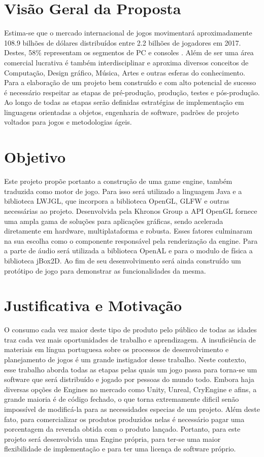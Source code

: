 \documentclass[12pt, 
openright, 
oneside, 
a4paper,    
brazil]{facom-ufu-abntex2}
\begin{document}
\section{Visão Geral da Proposta}
Estima-se que o mercado internacional de jogos movimentará aproximadamente 108.9
bilhões de dólares distribuídos entre 2.2 bilhões de jogadores em 2017. Destes, 58\%
representam os segmentos de PC e consoles \cite{GameMarketArticle}. Além de ser uma área
comercial lucrativa é também interdisciplinar e aproxima
diversos conceitos de Computação, Design gráfico, Música, Artes e outras esferas do
conhecimento.
Para a elaboração de um projeto bem construído e com alto potencial de
sucesso é necessário respeitar as etapas de pré-produção, produção, testes
e pós-produção. Ao longo de todas as etapas serão definidas estratégias de
implementação em linguagens orientadas a objetos, engenharia de software, padrões de projeto
voltados para jogos e metodologias ágeis.

\section{Objetivo}
Este projeto propõe portanto a construção de uma game engine, também traduzida como motor de jogo. Para isso será utilizado a linguagem Java e a biblioteca LWJGL, que incorpora a biblioteca OpenGL, GLFW e outras necessárias ao projeto.
Desenvolvida pela Khronos Group a API OpenGL fornece uma ampla gama de soluções para aplicações gráficas, sendo acelerada diretamente em
hardware, multiplataforma e robusta. Esses fatores culminaram na sua escolha como o componente responsável pela renderização da engine. Para a parte de áudio será utilizada a biblioteca OpenAL e para o modulo de física a biblioteca jBox2D. 
Ao fim de seu desenvolvimento será ainda construído um protótipo de jogo para demonstrar as funcionalidades da mesma. %

\section{Justificativa e Motivação}
O consumo cada vez maior deste tipo de produto pelo público de todas as idades traz cada vez mais oportunidades de trabalho e aprendizagem.
A insuficiência de materiais em língua portuguesa sobre os processos de desenvolvimento e planejamento de jogos é um grande instigador desse trabalho. Neste contexto, esse trabalho aborda todas as etapas pelas quais um jogo passa para torna-se um software que será distribuído e jogado por pessoas do mundo todo.
Embora haja diversas opções de Engines no mercado como Unity, Unreal, CryEngine e afins, a grande maioria é de código fechado, o que torna extremamente dificil senão impossível de modificá-la para as necessidades especias de um projeto. Além deste fato, para comercializar os produtos produzidos nelas é necessário pagar uma porcentagem da revenda obtida com o produto lançado. Portanto, para este projeto será desenvolvida uma Engine própria, para ter-se uma maior flexibilidade de implementação e para ter uma licença de software próprio.
\end{document}
